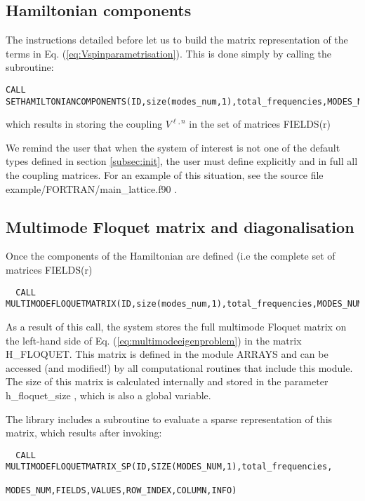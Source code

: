 \documentclass[10pt,a4paper]{article}
\begin{document}
\subsection{Hamiltonian components}

The instructions detailed before let us to build the matrix representation of the terms in Eq. (\ref{eq:Vspinparametrisation}). This is done simply by calling the subroutine:

\begin{verbatim}
CALL  SETHAMILTONIANCOMPONENTS(ID,size(modes_num,1),total_frequencies,MODES_NUM,FIELDS,INFO)
\end{verbatim}
which results in storing the coupling $V^{\ell,n}$ in the set of matrices   FIELDS(r)%

We remind the user that when the system of interest is not one of the default types defined in section \ref{subsec:init}, the user must define explicitly and in full all the coupling matrices. For an example of this situation, see  the source file    example/FORTRAN/main\_lattice.f90 .

\subsection{Multimode Floquet matrix and diagonalisation}

Once the components of the Hamiltonian are defined (i.e the complete set of matrices   FIELDS(r)%

\begin{verbatim}
  CALL MULTIMODEFLOQUETMATRIX(ID,size(modes_num,1),total_frequencies,MODES_NUM,FIELDS,INFO)          
\end{verbatim}

As a result of this call, the system stores the full multimode Floquet matrix on the left-hand side of Eq. (\ref{eq:multimodeeigenproblem}) in the matrix   H\_FLOQUET. This matrix is defined in the module   ARRAYS   and  can be accessed (and modified!) by all computational routines that include this module. The size of this matrix is calculated internally and stored in the parameter   h\_floquet\_size , which is also a global variable. 

The library includes a subroutine to evaluate a sparse representation of this matrix, which results after invoking:
\begin{verbatim}
  CALL MULTIMODEFLOQUETMATRIX_SP(ID,SIZE(MODES_NUM,1),total_frequencies,
                                 MODES_NUM,FIELDS,VALUES,ROW_INDEX,COLUMN,INFO)
\end{verbatim}
 
\end{document}
